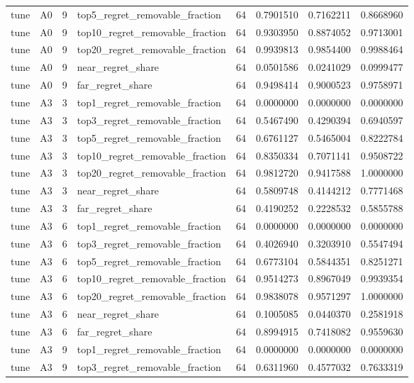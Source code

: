 \begin{tabular}{llrlrrrr}
tune & A0 & 9 & top5_regret_removable_fraction & 64 & 0.7901510 & 0.7162211 & 0.8668960 \\
tune & A0 & 9 & top10_regret_removable_fraction & 64 & 0.9303950 & 0.8874052 & 0.9713001 \\
tune & A0 & 9 & top20_regret_removable_fraction & 64 & 0.9939813 & 0.9854400 & 0.9988464 \\
tune & A0 & 9 & near_regret_share & 64 & 0.0501586 & 0.0241029 & 0.0999477 \\
tune & A0 & 9 & far_regret_share & 64 & 0.9498414 & 0.9000523 & 0.9758971 \\
tune & A3 & 3 & top1_regret_removable_fraction & 64 & 0.0000000 & 0.0000000 & 0.0000000 \\
tune & A3 & 3 & top3_regret_removable_fraction & 64 & 0.5467490 & 0.4290394 & 0.6940597 \\
tune & A3 & 3 & top5_regret_removable_fraction & 64 & 0.6761127 & 0.5465004 & 0.8222784 \\
tune & A3 & 3 & top10_regret_removable_fraction & 64 & 0.8350334 & 0.7071141 & 0.9508722 \\
tune & A3 & 3 & top20_regret_removable_fraction & 64 & 0.9812720 & 0.9417588 & 1.0000000 \\
tune & A3 & 3 & near_regret_share & 64 & 0.5809748 & 0.4144212 & 0.7771468 \\
tune & A3 & 3 & far_regret_share & 64 & 0.4190252 & 0.2228532 & 0.5855788 \\
tune & A3 & 6 & top1_regret_removable_fraction & 64 & 0.0000000 & 0.0000000 & 0.0000000 \\
tune & A3 & 6 & top3_regret_removable_fraction & 64 & 0.4026940 & 0.3203910 & 0.5547494 \\
tune & A3 & 6 & top5_regret_removable_fraction & 64 & 0.6773104 & 0.5844351 & 0.8251271 \\
tune & A3 & 6 & top10_regret_removable_fraction & 64 & 0.9514273 & 0.8967049 & 0.9939354 \\
tune & A3 & 6 & top20_regret_removable_fraction & 64 & 0.9838078 & 0.9571297 & 1.0000000 \\
tune & A3 & 6 & near_regret_share & 64 & 0.1005085 & 0.0440370 & 0.2581918 \\
tune & A3 & 6 & far_regret_share & 64 & 0.8994915 & 0.7418082 & 0.9559630 \\
tune & A3 & 9 & top1_regret_removable_fraction & 64 & 0.0000000 & 0.0000000 & 0.0000000 \\
tune & A3 & 9 & top3_regret_removable_fraction & 64 & 0.6311960 & 0.4577032 & 0.7633319 \\

\end{tabular}
